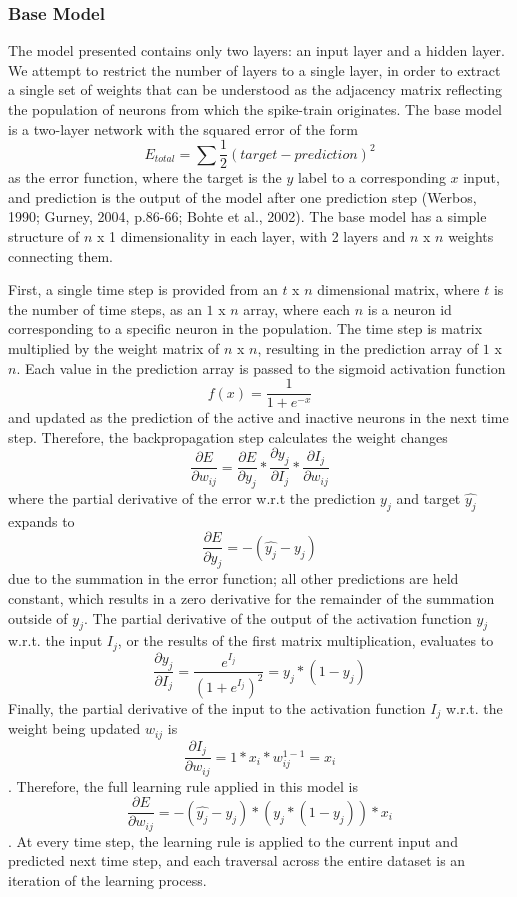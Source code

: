 \documentclass[11pt]{article}
\begin{document}
\subsubsection{Base Model}
The model presented contains only two layers: an input layer and a hidden layer. We attempt to restrict the number of layers to a single layer, in order to extract a single set of weights that can be understood as the adjacency matrix reflecting the population of neurons from which the spike-train originates. The base model is a two-layer network with the squared error of the form $$E_{total} = \sum{\frac{1}{2}(target-prediction)^2}$$ as the error function, where the target is the $y$ label to a corresponding $x$ input, and prediction is the output of the model after one prediction step (Werbos, 1990; Gurney, 2004, p.86-66; Bohte et al., 2002). The base model has a simple structure of $n$ x 1 dimensionality in each layer, with 2 layers and $n$ x $n$ weights connecting them.\par
First, a single time step is provided from an $t$ x $n$ dimensional matrix, where $t$ is the number of time steps, as an $1$ x $n$ array, where each $n$ is a neuron id corresponding to a specific neuron in the population. The time step is matrix multiplied by the weight matrix of $n$ x $n$, resulting in the prediction array of $1$ x $n$. Each value in the prediction array is passed to the sigmoid activation function $$ f(x) = \frac{1}{1 + e^{-x}}$$ and updated as the prediction of the active and inactive neurons in the next time step. Therefore, the backpropagation step calculates the weight changes $$\frac{\partial E}{\partial w_{ij}} = \frac{\partial E}{\partial y_j} * \frac{\partial y_j}{\partial I_{j}} * \frac{\partial I_{j}}{\partial w_{ij}}$$ where the partial derivative of the error w.r.t the prediction $y_j$ and target $\hat{y_j}$ expands to $$\frac{\partial E}{\partial y_j} = -(\hat{y_j} - y_j) $$ due to the summation in the error function; all other predictions are held constant, which results in a zero derivative for the remainder of the summation outside of $y_j$. The partial derivative of the output of the activation function $y_j$ w.r.t. the input $I_j$, or the results of the first matrix multiplication, evaluates to $$\frac{\partial y_j}{\partial I_j} = \frac{e^{I_j}}{(1+e^{I_j})^2} = y_j * (1 - y_j)$$ Finally, the partial derivative of the input to the activation function $I_j$ w.r.t. the weight being updated $w_{ij}$ is $$\frac{\partial I_j}{\partial w_{ij}} = 1 * x_i * w_{ij}^{1-1} = x_i$$. Therefore, the full learning rule applied in this model is $$ \frac{\partial E}{\partial w_{ij}} = -(\hat{y_j}-y_j) * (y_j*(1-y_j))*x_i$$. At every time step, the learning rule is applied to the current input and predicted next time step, and each traversal across the entire dataset is an iteration of the learning process.
\end{document}

